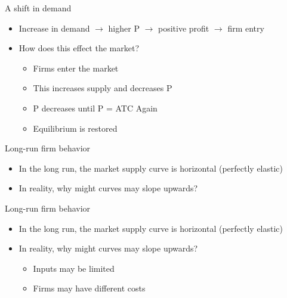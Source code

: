\documentclass[aspectratio=169]{beamer}
\begin{document}
\begin{frame}{A shift in demand}
    \begin{itemize}
        \item Increase in demand $\to$ higher P $\to$ positive profit $\to$ firm entry
        \item How does this effect the market?
            \begin{itemize}
                \item Firms enter the market
                \item This increases supply and decreases P
                \item P decreases until P = ATC Again
                \item Equilibrium is restored
            \end{itemize}
    \end{itemize}
\end{frame}

\begin{frame}{Long-run firm behavior}
    \begin{itemize}
        \item In the long run, the market supply curve is horizontal (perfectly elastic)
        \item In reality, why might curves may slope upwards?
    \end{itemize}
\end{frame}

\begin{frame}{Long-run firm behavior}
    \begin{itemize}
        \item In the long run, the market supply curve is horizontal (perfectly elastic)
        \item In reality, why might curves may slope upwards?
            \begin{itemize}
                \item Inputs may be limited
                \item Firms may have different costs
            \end{itemize}
    \end{itemize}
\end{frame}

\end{document}
